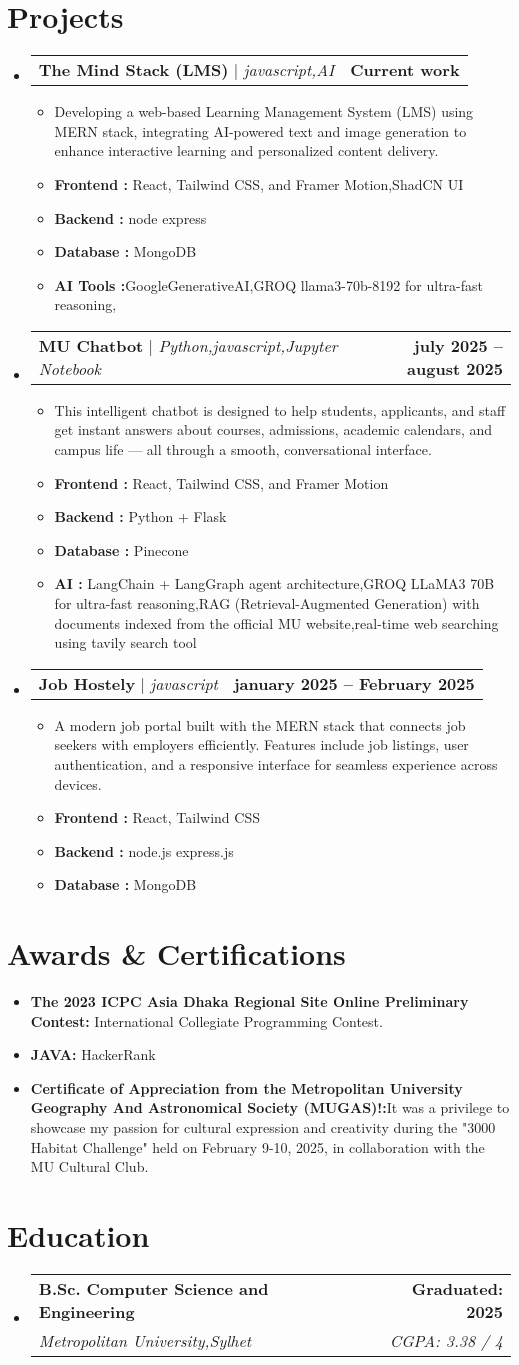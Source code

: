 \documentclass[letterpaper,11pt]{article}
\makeatletter
\newcommand{\resumeItem}[1]{\item\small{{#1 \vspace{-2pt}}}}
\newcommand{\resumeSubheading}[4]{
  \vspace{-2pt}\item
    \begin{tabular*}{1.0\textwidth}[t]{l@{\extracolsep{\fill}}r}
      \textbf{#1} & \textbf{\small #2} \\
      \textit{\small#3} & \textit{\small #4} \\
    \end{tabular*}\vspace{-6pt}
}
\newcommand{\resumeProjectHeading}[2]{
    \item
    \begin{tabular*}{1.001\textwidth}{l@{\extracolsep{\fill}}r}
      \small#1 & \textbf{\small #2}\\
    \end{tabular*}\vspace{-6pt}
}
\newcommand{\resumeItemListStart}{\begin{itemize}}
\newcommand{\resumeItemListEnd}{\end{itemize}\vspace{-5pt}}
\newcommand{\resumeSubHeadingListStart}{\begin{itemize}[leftmargin=0.0in, label={}]}
\newcommand{\resumeSubHeadingListEnd}{\end{itemize}}
\makeatother
\begin{document}
\section{Projects}
\resumeSubHeadingListStart
     \resumeProjectHeading
      {\textbf{The Mind Stack (LMS)} $|$ \emph{javascript,AI}}{Current work}
      \resumeItemListStart
        \resumeItem{Developing a web-based Learning Management System (LMS) using MERN stack, integrating AI-powered text and image generation to enhance interactive learning and personalized content delivery.}
        \resumeItem{\textbf{Frontend :} React, Tailwind CSS, and Framer Motion,ShadCN UI}
         \resumeItem{\textbf{Backend :} node express }
          \resumeItem{\textbf{Database :} MongoDB}
          \resumeItem{\textbf{AI Tools :}GoogleGenerativeAI,GROQ llama3-70b-8192 for ultra-fast reasoning,}
      \resumeItemListEnd
  \resumeProjectHeading
      {\textbf{MU Chatbot} $|$ \emph{Python,javascript,Jupyter Notebook }}{july 2025 -- august 2025}
      \resumeItemListStart
        \resumeItem{This intelligent chatbot is designed to help students, applicants, and staff get instant answers about courses, admissions, academic calendars, and campus life — all through a smooth, conversational interface.}
        \resumeItem{\textbf{Frontend :} React, Tailwind CSS, and Framer Motion}
         \resumeItem{\textbf{Backend :} Python + Flask}
          \resumeItem{\textbf{Database :} Pinecone}
          \resumeItem{\textbf{AI :} LangChain + LangGraph agent architecture,GROQ LLaMA3 70B for ultra-fast reasoning,RAG (Retrieval-Augmented Generation) with documents indexed from the official MU website,real-time web searching using tavily search tool}
      \resumeItemListEnd
 \resumeProjectHeading
      {\textbf{Job Hostely} $|$ \emph{javascript }}{january 2025 -- February 2025}
      \resumeItemListStart
        \resumeItem{A modern job portal built with the MERN stack that connects job seekers with employers efficiently. Features include job listings, user authentication, and a responsive interface for seamless experience across devices.}
        \resumeItem{\textbf{Frontend :} React, Tailwind CSS}
         \resumeItem{\textbf{Backend :} node.js express.js}
          \resumeItem{\textbf{Database :} MongoDB}
      \resumeItemListEnd
 
\resumeSubHeadingListEnd

\section{Awards \& Certifications}
\resumeItemListStart
  \resumeItem{\textbf{The 2023 ICPC Asia Dhaka Regional Site Online Preliminary Contest:}  International Collegiate Programming Contest.}
  \resumeItem{\textbf{JAVA:} HackerRank}
  \resumeItem{\textbf{Certificate of Appreciation from the Metropolitan University Geography And Astronomical Society (MUGAS)!:}It was a privilege to showcase my passion for cultural expression and creativity during the "3000 Habitat Challenge" held on February 9-10, 2025, in collaboration with the MU Cultural Club.}
\resumeItemListEnd

\section{Education}
\resumeSubHeadingListStart
  \resumeSubheading
    {B.Sc. Computer Science and Engineering}{Graduated: 2025}
    {Metropolitan University,Sylhet}{CGPA: 3.38 / 4}
\resumeSubHeadingListEnd
\end{document}
